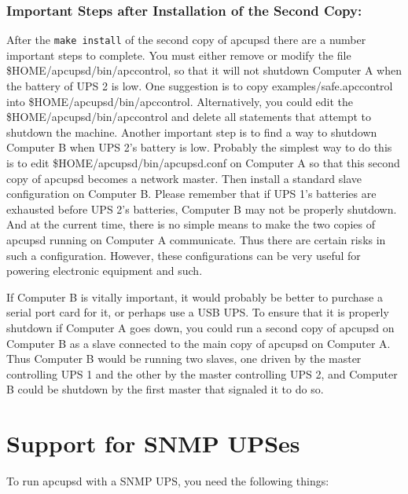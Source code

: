 {{{{{{{\label{Important-Steps-after-Installation-of-the-Second-Copy}

\subsubsection*{Important Steps after Installation of the Second Copy:}

After the {\tt make install} of the second copy of apcupsd there are a number
important steps to complete. You must either remove or modify the file
\$HOME/apcupsd/bin/apccontrol, so that it will not shutdown Computer A when
the battery of UPS 2 is low. One suggestion is to copy
examples/safe.apccontrol into \$HOME/apcupsd/bin/apccontrol. Alternatively,
you could edit the \$HOME/apcupsd/bin/apccontrol and delete all statements
that attempt to shutdown the machine. Another important step is to find a way
to shutdown Computer B when UPS 2's battery is low.  Probably the simplest way
to do this is to edit \$HOME/apcupsd/bin/apcupsd.conf on Computer A so that
this second copy of apcupsd becomes a network master. Then install a standard
slave configuration on Computer B. Please remember that if UPS 1's batteries
are exhausted before UPS 2's batteries, Computer B may not be properly
shutdown. And at the current time, there is no simple means to make the two
copies of apcupsd running on Computer A communicate. Thus there are certain
risks in such a configuration. However, these configurations can be very
useful for powering electronic equipment and such.  

If Computer B is vitally important, it would probably be better to purchase a
serial port card for it, or perhaps use a USB UPS. To ensure that it is
properly shutdown if Computer A goes down, you could run a second copy of
apcupsd on Computer B as a slave connected to the main copy of apcupsd on
Computer A. Thus Computer B would be running two slaves, one driven by the
master controlling UPS 1 and the other by the master controlling UPS 2, and
Computer B could be shutdown by the first master that signaled it to do so. 

\label{Support-for-SNMP-UPSes}

\section*{Support for SNMP UPSes}

\label{index-SNMP-162}
To run apcupsd with a SNMP UPS, you need the following things:  

}}}}}}}
